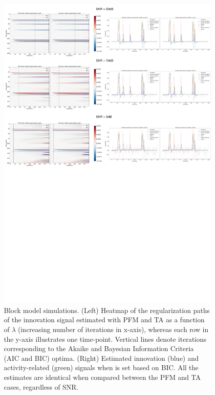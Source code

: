 \begin{figure}[t!]
    \begin{center}
        \includegraphics[width=\textwidth]{figures/regpath_block.pdf}
    \end{center}
    \caption{Block model simulations. (Left) Heatmap of the regularization paths of the innovation signal estimated with PFM and TA as a function of \(\lambda\) (increasing number of iterations in x-axis), whereas each row in the y-axis illustrates one time-point. Vertical lines denote iterations corresponding to the Akaike and Bayesian Information Criteria (AIC and BIC) optima. (Right) Estimated innovation (blue) and activity-related (green) signals when is set based on BIC. All the estimates are identical when compared between the PFM and TA cases, regardless of SNR.}
\label{fig:path_block}
\end{figure}

